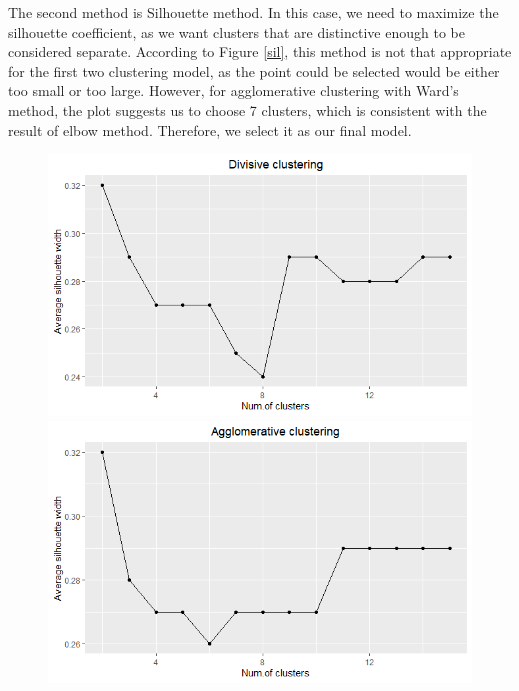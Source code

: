 The second method is Silhouette method. In this case, we need to maximize the silhouette coefficient, as we want clusters that are distinctive enough to be considered separate. According to Figure \ref{sil}, this method is not that appropriate for the first two clustering model, as the point could be selected would be either too small or too large. However, for agglomerative clustering with Ward's method, the plot suggests us to choose 7 clusters, which is consistent with the result of elbow method. Therefore, we select it as our final model.

\begin{figure}[!htb]
   \begin{minipage}{0.8\textwidth}
     \centering
     \includegraphics[width=1\linewidth]{image/shi_div.png}
   \end{minipage}\hfill
   \begin{minipage}{0.8\textwidth}
     \centering
     \includegraphics[width=1\linewidth]{image/shi_agg_c.png}
   \end{minipage}

\end{figure}
